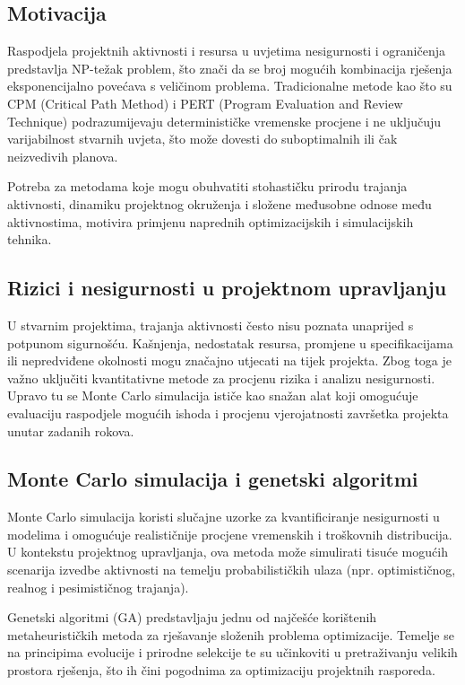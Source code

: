 \subsection{Motivacija}

Raspodjela projektnih aktivnosti i resursa u uvjetima nesigurnosti i ograničenja predstavlja NP-težak problem, što znači da se broj mogućih kombinacija rješenja eksponencijalno povećava s veličinom problema. Tradicionalne metode kao što su CPM (Critical Path Method) i PERT (Program Evaluation and Review Technique) podrazumijevaju determinističke vremenske procjene i ne uključuju varijabilnost stvarnih uvjeta, što može dovesti do suboptimalnih ili čak neizvedivih planova.

Potreba za metodama koje mogu obuhvatiti stohastičku prirodu trajanja aktivnosti, dinamiku projektnog okruženja i složene međusobne odnose među aktivnostima, motivira primjenu naprednih optimizacijskih i simulacijskih tehnika.

\subsection{Rizici i nesigurnosti u projektnom upravljanju}

U stvarnim projektima, trajanja aktivnosti često nisu poznata unaprijed s potpunom sigurnošću. Kašnjenja, nedostatak resursa, promjene u specifikacijama ili nepredviđene okolnosti mogu značajno utjecati na tijek projekta. Zbog toga je važno uključiti kvantitativne metode za procjenu rizika i analizu nesigurnosti. Upravo tu se Monte Carlo simulacija ističe kao snažan alat koji omogućuje evaluaciju raspodjele mogućih ishoda i procjenu vjerojatnosti završetka projekta unutar zadanih rokova.

\subsection{Monte Carlo simulacija i genetski algoritmi}

Monte Carlo simulacija koristi slučajne uzorke za kvantificiranje nesigurnosti u modelima i omogućuje realističnije procjene vremenskih i troškovnih distribucija. U kontekstu projektnog upravljanja, ova metoda može simulirati tisuće mogućih scenarija izvedbe aktivnosti na temelju probabilističkih ulaza (npr. optimističnog, realnog i pesimističnog trajanja).

Genetski algoritmi (GA) predstavljaju jednu od najčešće korištenih metaheurističkih metoda za rješavanje složenih problema optimizacije. Temelje se na principima evolucije i prirodne selekcije te su učinkoviti u pretraživanju velikih prostora rješenja, što ih čini pogodnima za optimizaciju projektnih rasporeda.

